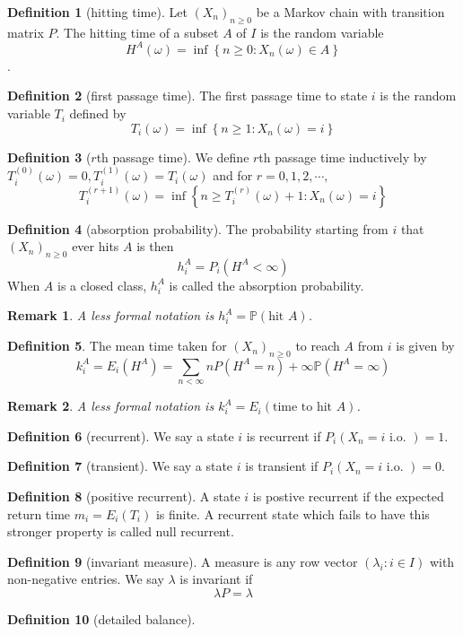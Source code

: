 \documentclass{article}
\newtheorem*{Rk}{Remark}
\theoremstyle{definition}
\newtheorem{Def}{Definition}[section]
\newcommand{\PP}{\mathbb{P}}
\renewcommand{\geq}{\geqslant}
\newcommand{\<}{\left\langle}
\renewcommand{\>}{\right\rangle}
\begin{document}
\begin{Def}[hitting time]
    Let $(X_n)_{n\geq 0}$ be a Markov chain with transition matrix $P$. The hitting time of a subset $A$ of $I$ is the random
    variable \[H^A(\omega)=\inf \left\{n\geq 0:X_n(\omega)\in A\right\}\].
\end{Def}
\begin{Def}[first passage time]
    The first passage time to state $i$ is the random variable $T_i$ defined by \[T_i(\omega)=\inf\left\{n\geq 1:X_n(\omega)=i\right\}\]
\end{Def}
\begin{Def}[$r$th passage time]
    We define $r$th passage time inductively by 
    $T_i^{(0)}(\omega)=0,T_i^{(1)}(\omega)=T_i(\omega)$
    and for $r=0,1,2,\cdots,$
    \[T_i^{(r+1)}(\omega)=\inf\left\{n\geq T_i^{(r)}(\omega)+1:X_n(\omega)=i\right\}\]
\end{Def}


\begin{Def}[absorption probability]
    The probability starting from $i$ that $(X_n)_{n\geq 0}$ ever hits $A$ is then \[h_i^A=P_i(H^A<\infty)\]
    When $A$ is a closed class, $h_i^A$ is called the absorption probability.
\end{Def}
\begin{Rk}
A less formal notation is $h_i^A=\PP(\text{hit }A)$.
\end{Rk}
\begin{Def}
    The mean time taken for $(X_n)_{n\geq 0}$ to reach $A$ from $i$ is given by \[k_i^A=E_i(H^A)=\sum_{n<\infty}nP(H^A=n)+\infty \PP(H^A=\infty)\]
\end{Def}
\begin{Rk}
    A less formal notation is $k_i^A=E_i(\text{time to hit }A)$.
\end{Rk}


\begin{Def}[recurrent]
    We say a state $i$ is recurrent if $P_i(X_n=i\text{ i.o. })=1$.
\end{Def}
\begin{Def}[transient]
    We say a state $i$ is transient if $P_i(X_n=i\text{ i.o. })=0$.
\end{Def}
\begin{Def}[positive recurrent]
    A state $i$ is postive recurrent if the expected return time $m_i=E_i(T_i)$ is finite.
    A recurrent state which fails to have this stronger property is called null recurrent.
\end{Def}
\begin{Def}[invariant measure]
    A measure is any row vector $(\lambda_i:i\in I)$ with non-negative entries. We say $\lambda$ is invariant if \[\lambda P=\lambda\]
\end{Def}
\begin{Def}[detailed balance]
    
\end{Def}
\end{document}
